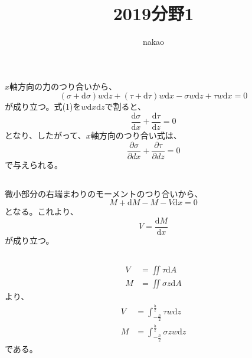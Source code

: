 \documentclass[a4paper]{jsarticle}
\begin{document}
\title{2019分野1}
\author{nakao}
\maketitle

\section{}
\subsection{}
$x$軸方向の力のつり合いから、
\begin{equation}
  (\sigma + \mathrm{d} \sigma) w \mathrm{d} z
  + (\tau + \mathrm{d} \tau) w \mathrm{d} x
  - \sigma w \mathrm{d} z
  + \tau w \mathrm{d} x = 0
\end{equation}
が成り立つ。式(1)を$w \mathrm{d} x \mathrm{d} z$で割ると、
\begin{equation}
  \frac{\mathrm{d} \sigma}{\mathrm{d} x}
  + \frac{\mathrm{d} \tau}{\mathrm{d} z} = 0
\end{equation}
となり、したがって、$x$軸方向のつり合い式は、
\begin{equation}
  \frac{\partial \sigma}{\partial{d} x}
  + \frac{\partial \tau}{\partial{d} z} = 0
\end{equation}
で与えられる。

\subsection{}
微小部分の右端まわりのモーメントのつり合いから、
\begin{equation}
  M + \mathrm{d} M - M - V \mathrm{d} x = 0
\end{equation}
となる。これより、
\begin{equation}
  V = \frac{\mathrm{d} M}{\mathrm{d} x}
\end{equation}
が成り立つ。

\subsection{}
\begin{align}
  V &= \iint \tau \mathrm{d} A \\
  M &= \iint \sigma z \mathrm{d} A
\end{align}
より、
\begin{align}
  V &= \int_{-\frac{h}{2}}^{\frac{h}{2}} \tau w \mathrm{d} z \\
  M &= \int_{-\frac{h}{2}}^{\frac{h}{2}} \sigma z w \mathrm{d} z
\end{align}
である。
\end{document}
